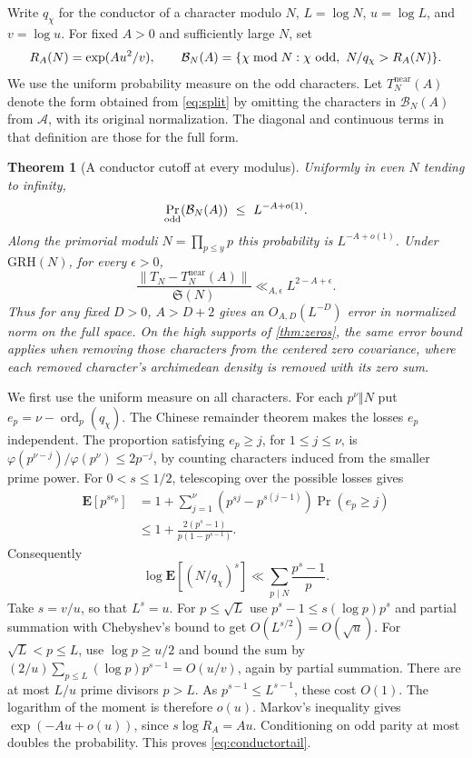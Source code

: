 \documentclass[11pt,a4paper]{article}
\numberwithin{equation}{section}
\newtheorem{theorem}{Theorem}[section]
\newcommand{\SSS}{\mathfrak S}
\newcommand{\grh}{\mathrm{GRH}}
\begin{document}
Write $q_\chi$ for the conductor of a character modulo $N$,
$L=\log N$, $u=\log L$, and $v=\log u$. For fixed $A>0$
and sufficiently large $N$, set
\[
 R_A(N)=\exp(Au^2/v),\qquad
 \mathcal B_N(A)=\{\chi\bmod N:\chi\ {\rm odd},\
                                      N/q_\chi>R_A(N)\}.
\]
We use the uniform probability measure on the odd characters.
Let $T_N^{\mathrm{near}}(A)$ denote the form obtained from
\cref{eq:split} by omitting the characters in $\mathcal B_N(A)$
from $\mathcal A$, with its original normalization.
The diagonal and continuous terms in that definition are
those for the full form.

\begin{theorem}[A conductor cutoff at every modulus]
\label{thm:conductorcutoff}
Uniformly in even $N$ tending to infinity,
\begin{equation}
 \Pr_{\rm odd}(\mathcal B_N(A))\ \le\ L^{-A+o(1)}.
 \label{eq:conductortail}
\end{equation}
Along the primorial moduli $N=\prod_{p\le y}p$ this probability
is $L^{-A+o(1)}$.
Under $\grh(N)$, for every $\epsilon>0$,
\begin{equation}
 \frac{\|T_N-T_N^{\mathrm{near}}(A)\|}{\SSS(N)}
       \ll_{A,\epsilon}L^{2-A+\epsilon}.
 \label{eq:conductordelete}
\end{equation}
Thus for any fixed $D>0$, $A>D+2$ gives an $O_{A,D}(L^{-D})$
error in normalized norm on the full space. On the high supports
of \cref{thm:zeros}, the same error bound applies when removing
those characters from the centered zero covariance,
where each removed character's archimedean density is
removed with its zero sum.
\end{theorem}

We first use the uniform measure on all characters. For each
$p^\nu\Vert N$ put $e_p=\nu-\operatorname{ord}_p(q_\chi)$.
The Chinese remainder theorem makes the losses $e_p$
independent. The proportion satisfying $e_p\ge j$, for
$1\le j\le\nu$, is $\varphi(p^{\nu-j})/\varphi(p^\nu)\le2p^{-j}$,
by counting characters induced from the smaller prime power.
For $0<s\le1/2$, telescoping over the possible losses gives
\begin{align*}
 \mathbf E[p^{s e_p}]
   &=1+\sum_{j=1}^\nu
             (p^{sj}-p^{s(j-1)})\Pr(e_p\ge j)\\
   &\le 1+\frac{2(p^s-1)}{p(1-p^{s-1})}.
\end{align*}
Consequently
\[
 \log\mathbf E[(N/q_\chi)^s]
       \ll \sum_{p\mid N}\frac{p^s-1}{p}.
\]
Take $s=v/u$, so that $L^s=u$. For $p\le\sqrt L$ use
$p^s-1\le s(\log p)p^s$ and partial summation with
Chebyshev's bound to get $O(L^{s/2})=O(\sqrt u)$.
For $\sqrt L<p\le L$, use $\log p\ge u/2$ and bound the
sum by $(2/u)\sum_{p\le L}(\log p)p^{s-1}=O(u/v)$,
again by partial summation. There are at most $L/u$
prime divisors $p>L$. As $p^{s-1}\le L^{s-1}$, these cost
$O(1)$. The logarithm of the moment is therefore $o(u)$.
Markov's inequality gives $\exp(-Au+o(u))$, since
$s\log R_A=Au$. Conditioning on odd parity at most doubles
the probability. This proves \cref{eq:conductortail}.
\end{document}
